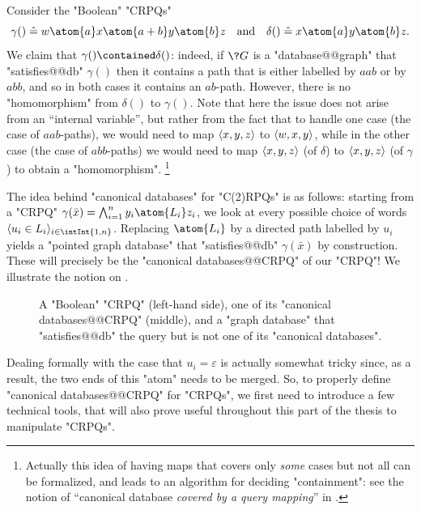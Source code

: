 \begin{example}
    \label{ex:ex-containment-non-uniform}
    Consider the "Boolean" "CRPQs"
    \[
        \gamma() \defeq w \atom{a} x \atom{a+b} y \atom{b} z
        \quad\text{and}\quad 
        \delta() \defeq x \atom{a} y \atom{b} z.
    \]
    We claim that $\gamma() \contained \delta()$: indeed, 
    if $\?G$ is a "database@@graph" that "satisfies@@db" $\gamma()$
    then it contains a path that is either labelled by
    $aab$ or by $abb$, and so in both cases it contains an $ab$-path.
    However, there is no "homomorphism" from $\delta()$ to $\gamma()$.
    Note that here the issue does not arise from an
    ``internal variable'', but rather from the fact that
    to handle one case (the case of $aab$-paths), we would need to
    map $\langle x,y,z\rangle$ to $\langle w,x,y\rangle$, while in the other case (the case of
    $abb$-paths) we would need to map $\langle x,y,z\rangle$ (of $\delta$)
    to $\langle x,y,z\rangle$ (of $\gamma$) to obtain a "homomorphism".%
    \footnote[][-10em]{Actually this idea of having maps that covers only \emph{some} cases
    but not all can be formalized, and leads to an algorithm
    for deciding "containment": see the notion of
    ``canonical database \emph{covered by a query mapping}'' in \cite{FlorescuLevySuciu1998Containment}.}
\end{example}

The idea behind "canonical databases" for "C(2)RPQs" is as follows:
starting from a "CRPQ" $\gamma(\bar x) = \bigwedge_{i=1}^n y_i \atom{L_i} z_i$,
we look at every possible choice of words $\tup{u_i \in L_i}_{i\in \intInt{1,n}}$.
Replacing $\atom{L_i}$ by a directed path labelled by $u_i$ yields a "pointed graph database"
that "satisfies@@db" $\gamma(\bar x)$ by construction. These will precisely be
the "canonical databases@@CRPQ" of our "CRPQ"! We illustrate the notion on
.
\begin{figure}
    \centering
    \begin{tikzpicture}
        
    \end{tikzpicture}
    \caption{\AP\label{fig:first-ex-cdb-wow-im-moved}
    A "Boolean" "CRPQ" (left-hand side), one of its "canonical databases@@CRPQ"
    (middle), and a "graph database" that "satisfies@@db" the query but is not one of its "canonical databases".
    }
\end{figure}
Dealing formally with the case that $u_i = \varepsilon$ is actually somewhat tricky
since, as a result, the two ends of this "atom" needs to be merged.
So, to properly define "canonical databases@@CRPQ" for "CRPQs",
we first need to introduce a few technical tools, that will also prove useful throughout this
part of the thesis to manipulate "CRPQs".

